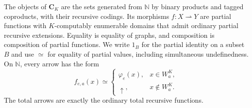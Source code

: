 \documentclass[letterpaper,10pt]{amsart}
\theoremstyle{plain}
\theoremstyle{definition}
\begin{document}
The objects of $\mathbf C_K$ are the sets generated from $\mathbb N$
by binary products and tagged coproducts, with their recursive codings.
Its morphisms $f:X\rightharpoonup Y$ are partial functions with
$K$-computably enumerable domains that admit ordinary partial recursive
extensions. Equality is equality of graphs, and composition is composition
of partial functions. We write $1_B$ for the partial identity on a
subset $B$ and use $\simeq$ for equality of partial values, including
simultaneous undefinedness. On $\mathbb N$, every arrow has the form
\[
f_{e,a}(x)\simeq
\begin{cases}
\varphi_e(x),&x\in W_a^K,\\
\uparrow,&x\notin W_a^K.
\end{cases}
\]
The total arrows are exactly the ordinary
total recursive functions.
\end{document}
